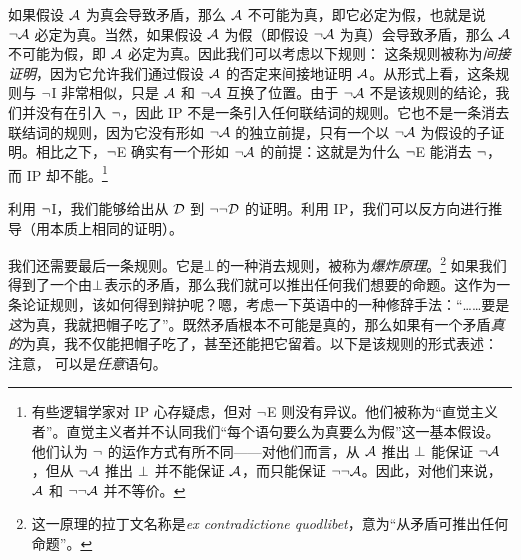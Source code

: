 如果假设 $\mathcal{A}$ 为真会导致矛盾，那么 $\mathcal{A}$ 不可能为真，即它必定为假，也就是说 $\neg\mathcal{A}$ 必定为真。当然，如果假设 $\mathcal{A}$ 为假（即假设 $\neg\mathcal{A}$ 为真）会导致矛盾，那么 $\mathcal{A}$ 不可能为假，即 $\mathcal{A}$ 必定为真。因此我们可以考虑以下规则：
这条规则被称为\emph{间接证明}，因为它允许我们通过假设 $\mathcal{A}$ 的否定来间接地证明 $\mathcal{A}$。从形式上看，这条规则与 $\neg$I 非常相似，只是 $\mathcal{A}$ 和 $\neg\mathcal{A}$ 互换了位置。由于 $\neg\mathcal{A}$ 不是该规则的结论，我们并没有在引入 $\neg$，因此 IP 不是一条引入任何联结词的规则。它也不是一条消去联结词的规则，因为它没有形如 $\neg\mathcal{A}$ 的独立前提，只有一个以 $\neg\mathcal{A}$ 为假设的子证明。相比之下，$\neg$E 确实有一个形如 $\neg\mathcal{A}$ 的前提：这就是为什么 $\neg$E 能消去 $\neg$，而 IP 却不能。\footnote{有些逻辑学家对 IP 心存疑虑，但对 $\neg$E 则没有异议。他们被称为“直觉主义者”。直觉主义者并不认同我们“每个语句要么为真要么为假”这一基本假设。他们认为 $\neg$ 的运作方式有所不同——对他们而言，从 $\mathcal{A}$ 推出 $\bot$ 能保证 $\neg \mathcal{A}$，但从 $\neg\mathcal{A}$ 推出 $\bot$ 并不能保证 $\mathcal{A}$，而只能保证 $\neg\neg\mathcal{A}$。因此，对他们来说，$\mathcal{A}$ 和 $\neg\neg\mathcal{A}$ 并不等价。}

利用 $\neg$I，我们能够给出从 $\mathcal{D}$ 到 $\neg\neg\mathcal{D}$ 的证明。利用 IP，我们可以反方向进行推导（用本质上相同的证明）。


\begin{fitchproof}
		\PR
		\open
			\AS
		\close
	\end{fitchproof}

我们还需要最后一条规则。它是$\bot$的一种消去规则，被称为\emph{爆炸原理}。\footnote{这一原理的拉丁文名称是\emph{ex contradictione quodlibet}，意为“从矛盾可推出任何命题”。} 如果我们得到了一个由$\bot$表示的矛盾，那么我们就可以推出任何我们想要的命题。这作为一条论证规则，该如何得到辩护呢？嗯，考虑一下英语中的一种修辞手法：“……要是\emph{这}为真，我就把帽子吃了”。既然矛盾根本不可能是真的，那么如果有一个矛盾\emph{真的}为真，我不仅能把帽子吃了，甚至还能把它留着。以下是该规则的形式表述：
注意， 可以是\emph{任意}语句。

